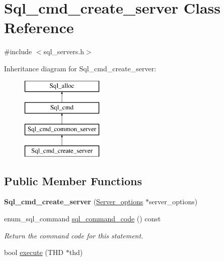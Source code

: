 \hypertarget{classSql__cmd__create__server}{}\section{Sql\+\_\+cmd\+\_\+create\+\_\+server Class Reference}
\label{classSql__cmd__create__server}


{\ttfamily \#include $<$sql\+\_\+servers.\+h$>$}

Inheritance diagram for Sql\+\_\+cmd\+\_\+create\+\_\+server\+:\begin{figure}[H]
\begin{center}
\leavevmode
\includegraphics[height=4.000000cm]{classSql__cmd__create__server}
\end{center}
\end{figure}
\subsection*{Public Member Functions}
\begin{DoxyCompactItemize}
\item 
\mbox{\label{classSql__cmd__create__server_a6c6e11b8f1f8b8b8e5d16c8129f32d1e}} 
{\bfseries Sql\+\_\+cmd\+\_\+create\+\_\+server} (\mbox{\hyperlink{classServer__options}{Server\+\_\+options}} $\ast$server\+\_\+options)
\item 
\mbox{\label{classSql__cmd__create__server_ac9521d757ac0b4f180a0671053dcbf55}} 
enum\+\_\+sql\+\_\+command \mbox{\hyperlink{classSql__cmd__create__server_ac9521d757ac0b4f180a0671053dcbf55}{sql\+\_\+command\+\_\+code}} () const
\begin{DoxyCompactList}\small\item\em Return the command code for this statement. \end{DoxyCompactList}\item 
bool \mbox{\hyperlink{classSql__cmd__create__server_a8e7f8717451abfb04ef6ddbacfe76428}{execute}} (T\+HD $\ast$thd)
\end{DoxyCompactItemize}
